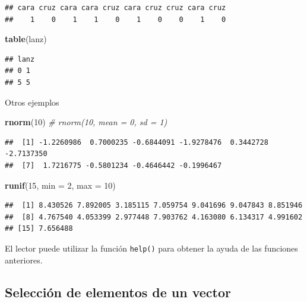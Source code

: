 \documentclass[]{book}
\newenvironment{Shaded}{\begin{snugshade}}{\end{snugshade}}
\newcommand{\KeywordTok}[1]{\textcolor[rgb]{0.13,0.29,0.53}{\textbf{#1}}}
\newcommand{\DataTypeTok}[1]{\textcolor[rgb]{0.13,0.29,0.53}{#1}}
\newcommand{\DecValTok}[1]{\textcolor[rgb]{0.00,0.00,0.81}{#1}}
\newcommand{\CommentTok}[1]{\textcolor[rgb]{0.56,0.35,0.01}{\textit{#1}}}
\newcommand{\NormalTok}[1]{#1}
\begin{document}
\begin{verbatim}
## cara cruz cara cara cruz cara cruz cruz cara cruz 
##    1    0    1    1    0    1    0    0    1    0
\end{verbatim}

\begin{Shaded}
\begin{Highlighting}[]
\KeywordTok{table}\NormalTok{(lanz)}
\end{Highlighting}
\end{Shaded}

\begin{verbatim}
## lanz
## 0 1 
## 5 5
\end{verbatim}

Otros ejemplos

\begin{Shaded}
\begin{Highlighting}[]
\KeywordTok{rnorm}\NormalTok{(}\DecValTok{10}\NormalTok{)  }\CommentTok{# rnorm(10, mean = 0, sd = 1)}
\end{Highlighting}
\end{Shaded}

\begin{verbatim}
##  [1] -1.2260986  0.7000235 -0.6844091 -1.9278476  0.3442728 -2.7137350
##  [7]  1.7216775 -0.5801234 -0.4646442 -0.1996467
\end{verbatim}

\begin{Shaded}
\begin{Highlighting}[]
\KeywordTok{runif}\NormalTok{(}\DecValTok{15}\NormalTok{, }\DataTypeTok{min =} \DecValTok{2}\NormalTok{, }\DataTypeTok{max =} \DecValTok{10}\NormalTok{)}
\end{Highlighting}
\end{Shaded}

\begin{verbatim}
##  [1] 8.430526 7.892005 3.185115 7.059754 9.041696 9.047843 8.851946
##  [8] 4.767540 4.053399 2.977448 7.903762 4.163080 6.134317 4.991602
## [15] 7.656488
\end{verbatim}

El lector puede utilizar la función \texttt{help()} para obtener la
ayuda de las funciones anteriores.

\subsection{Selección de elementos de un
vector}\label{seleccion-de-elementos-de-un-vector}
\end{document}
